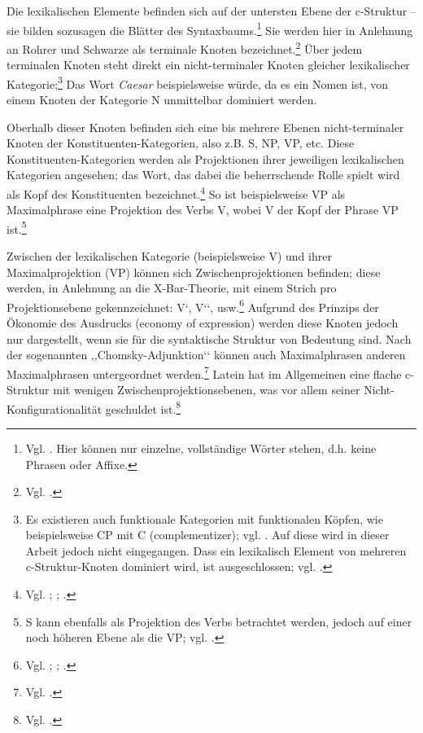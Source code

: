 \documentclass[12pt,a4paper]{article}
\begin{document}
Die lexikalischen Elemente befinden sich auf der untersten Ebene der c-Struktur -- sie bilden sozusagen die Blätter des Syntaxbaums.\footnote{Vgl. \cite[7]{Dal}. Hier können nur einzelne, vollständige Wörter stehen, d.h. keine Phrasen oder Affixe.} Sie werden hier in Anlehnung an Rohrer und Schwarze als terminale Knoten bezeichnet.\footnote{Vgl. \cite[14; 61]{Rohrer}.} Über jedem terminalen Knoten steht direkt ein nicht-terminaler Knoten gleicher lexikalischer Kategorie;\footnote{Es existieren auch funktionale Kategorien mit funktionalen Köpfen, wie beispielsweise CP mit C (complementizer); vgl. \cite[46; 53; 63-4]{Dal}. Auf diese wird in dieser Arbeit jedoch nicht eingegangen. Dass ein lexikalisch Element von mehreren c-Struktur-Knoten dominiert wird, ist ausgeschlossen; vgl. \cite[63]{Skript}.} Das Wort \textit{Caesar} beispielsweise würde, da es ein Nomen ist, von einem Knoten der Kategorie N unmittelbar dominiert werden.

Oberhalb dieser Knoten befinden sich eine bis mehrere Ebenen nicht-terminaler Knoten der Konstituenten-Kategorien, also z.B. S, NP, VP, etc. Diese Konstituenten-Kategorien werden als Projektionen ihrer jeweiligen lexikalischen Kategorien angesehen; das Wort, das dabei die beherrschende Rolle spielt wird als Kopf des Konstituenten bezeichnet.\footnote{Vgl. \cite[13; 15]{Rohrer}; \cite[64]{Dal}; \cite[5; 28]{Skript}.} So ist beispielsweise VP als Maximalphrase eine Projektion des Verbs V, wobei V der Kopf der Phrase VP ist.\footnote{S kann ebenfalls als Projektion des Verbs betrachtet werden, jedoch auf einer noch höheren Ebene als die VP; vgl. \cite[15]{Rohrer}.} 

Zwischen der lexikalischen Kategorie (beispielsweise V) und ihrer Maximalprojektion (VP) können sich Zwischenprojektionen befinden; diese werden, in Anlehnung an die X-Bar-Theorie, mit einem Strich pro Projektionsebene gekennzeichnet: V‘, V‘‘, usw.\footnote{Vgl. \cite[15-6]{Rohrer}; \cite[56-7]{Dal}; \cite[5]{Skript}.} Aufgrund des Prinzips der Ökonomie des Ausdrucks (economy of expression) werden diese Knoten jedoch nur dargestellt, wenn sie für die syntaktische Struktur von Bedeutung sind. Nach der sogenannten ,,Chomsky-Adjunktion‘‘ können auch Maximalphrasen anderen Maximalphrasen untergeordnet werden.\footnote{Vgl. \cite[46; 57]{Dal}.} Latein hat im Allgemeinen eine flache c-Struktur mit wenigen Zwischenprojektionsebenen, was vor allem seiner Nicht-Konfigurationalität geschuldet ist.\footnote{Vgl. \cite[46]{Rohrer}.}
\end{document}
